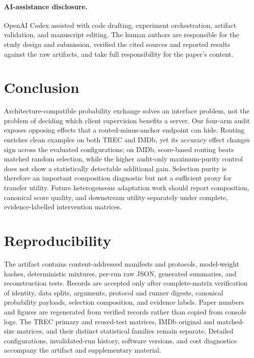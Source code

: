 \documentclass[letterpaper]{article}
\begin{document}
\paragraph{AI-assistance disclosure.}
OpenAI Codex assisted with code drafting, experiment orchestration, artifact
validation, and manuscript editing.  The human authors are responsible for
the study design and submission, verified the cited sources and reported
results against the raw artifacts, and take full responsibility for the
paper's content.

\section{Conclusion}
Architecture-compatible probability exchange solves an interface problem, not
the problem of deciding which client supervision benefits a server.  Our
four-arm audit exposes opposing effects that a routed-minus-anchor endpoint can
hide.  Routing enriches clean examples on both TREC and IMDb, yet its accuracy
effect changes sign across the evaluated configurations; on IMDb, score-based
routing beats matched random selection, while the higher audit-only
maximum-purity control does not show a statistically detectable additional gain.
Selection purity is therefore an important composition diagnostic but not a
sufficient proxy for transfer utility.  Future heterogeneous adaptation work should
report composition, canonical score quality, and downstream utility separately
under complete, evidence-labelled intervention matrices.

\section{Reproducibility}
The artifact contains content-addressed manifests and protocols, model-weight
hashes, deterministic mixtures, per-run raw JSON, generated summaries, and
reconstruction tests.  Records are accepted only after complete-matrix
verification of
identity, data splits, arguments, protocol and runner digests, canonical
probability payloads, selection composition, and evidence labels.  Paper
numbers and figures are regenerated from verified records rather than copied
from console logs.  The TREC primary and reused-test matrices, IMDb original
and matched-size matrices, and their distinct statistical families remain
separate.  Detailed configurations, invalidated-run history, software versions,
and cost diagnostics accompany the artifact and supplementary material.


\end{document}
